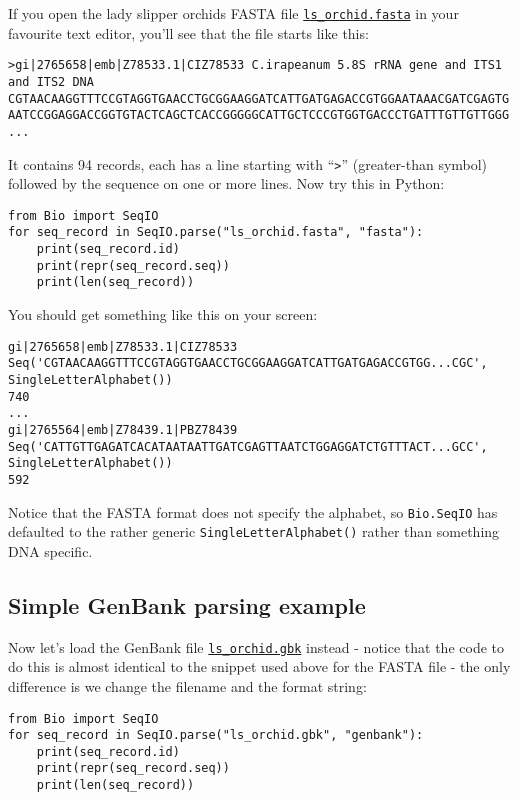 \documentclass{report}
\begin{document}
If you open the lady slipper orchids FASTA file \href{http://biopython.org/DIST/docs/tutorial/examples/ls_orchid.fasta}{\tt ls\_orchid.fasta} in your favourite text editor, you'll see that the file starts like this:

\begin{verbatim}
>gi|2765658|emb|Z78533.1|CIZ78533 C.irapeanum 5.8S rRNA gene and ITS1 and ITS2 DNA
CGTAACAAGGTTTCCGTAGGTGAACCTGCGGAAGGATCATTGATGAGACCGTGGAATAAACGATCGAGTG
AATCCGGAGGACCGGTGTACTCAGCTCACCGGGGGCATTGCTCCCGTGGTGACCCTGATTTGTTGTTGGG
...
\end{verbatim}

It contains 94 records, each has a line starting with ``\verb+>+'' (greater-than symbol) followed by the sequence on one or more lines.  Now try this in Python:

\begin{verbatim}
from Bio import SeqIO
for seq_record in SeqIO.parse("ls_orchid.fasta", "fasta"):
    print(seq_record.id)
    print(repr(seq_record.seq))
    print(len(seq_record))
\end{verbatim}

\noindent You should get something like this on your screen:

\begin{verbatim}
gi|2765658|emb|Z78533.1|CIZ78533
Seq('CGTAACAAGGTTTCCGTAGGTGAACCTGCGGAAGGATCATTGATGAGACCGTGG...CGC', SingleLetterAlphabet())
740
...
gi|2765564|emb|Z78439.1|PBZ78439
Seq('CATTGTTGAGATCACATAATAATTGATCGAGTTAATCTGGAGGATCTGTTTACT...GCC', SingleLetterAlphabet())
592
\end{verbatim}

Notice that the FASTA format does not specify the alphabet, so \verb|Bio.SeqIO| has defaulted to the rather generic \verb|SingleLetterAlphabet()| rather than something DNA specific.

\subsection{Simple GenBank parsing example}

Now let's load the GenBank file \href{http://biopython.org/DIST/docs/tutorial/examples/ls_orchid.gbk}{\tt ls\_orchid.gbk} instead - notice that the code to do this is almost identical to the snippet used above for the FASTA file - the only difference is we change the filename and the format string:

\begin{verbatim}
from Bio import SeqIO
for seq_record in SeqIO.parse("ls_orchid.gbk", "genbank"):
    print(seq_record.id)
    print(repr(seq_record.seq))
    print(len(seq_record))
\end{verbatim}
\end{document}
